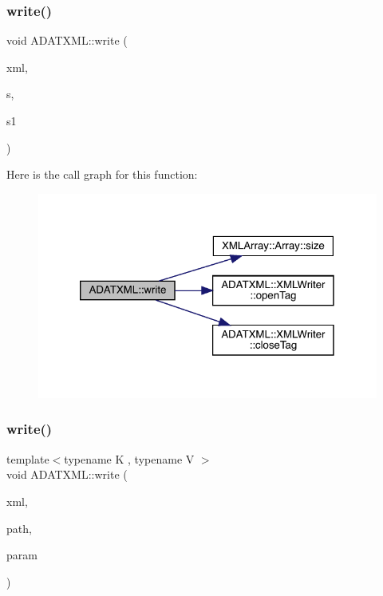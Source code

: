 \mbox{\label{group__io_ga82a292d577216b66e12c9876c7fe7a10}} 
\subsubsection{\texorpdfstring{write()}{write()}\hspace{0.1cm}{\footnotesize\ttfamily [28/58]}}
{\footnotesize\ttfamily void A\+D\+A\+T\+X\+M\+L\+::write (\begin{DoxyParamCaption}\item[{\mbox{\hyperlink{classADATXML_1_1XMLWriter}{X\+M\+L\+Writer}} \&}]{xml,  }\item[{const std\+::string \&}]{s,  }\item[{const \mbox{\hyperlink{classXMLArray_1_1Array}{Array}}$<$ double $>$ \&}]{s1 }\end{DoxyParamCaption})}

Here is the call graph for this function\+:\nopagebreak
\begin{figure}[H]
\begin{center}
\leavevmode
\includegraphics[width=320pt]{d2/da3/group__io_ga82a292d577216b66e12c9876c7fe7a10_cgraph}
\end{center}
\end{figure}
\mbox{\label{group__io_gaab13ff0d8972a4435cd3590b6c87ea05}} 
\subsubsection{\texorpdfstring{write()}{write()}\hspace{0.1cm}{\footnotesize\ttfamily [29/58]}}
{\footnotesize\ttfamily template$<$typename K , typename V $>$ \\
void A\+D\+A\+T\+X\+M\+L\+::write (\begin{DoxyParamCaption}\item[{\mbox{\hyperlink{classADATXML_1_1XMLWriter}{X\+M\+L\+Writer}} \&}]{xml,  }\item[{const std\+::string \&}]{path,  }\item[{const std\+::map$<$ K, V $>$ \&}]{param }\end{DoxyParamCaption})\hspace{0.3cm}{\ttfamily [inline]}}



